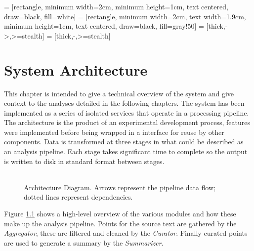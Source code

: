  = [rectangle, minimum width=2cm, minimum height=1cm, text centered, draw=black, fill=white]
 = [rectangle, minimum width=2cm, text width=1.9cm, minimum height=1cm, text centered, draw=black, fill=gray!50]
 = [thick,->,>=stealth]
 = [thick,-,>=stealth]

\chapter{System Architecture\label{chap:system-architecture}}
  This chapter is intended to give a technical overview of the system and give context to the analyses detailed in the following chapters. The system has been implemented as a series of isolated services that operate in a processing pipeline. The architecture is the product of an experimental development process, features were implemented before being wrapped in a interface for reuse by other components. Data is transformed at three stages in what could be described as an analysis pipeline. Each stage takes significant time to complete so the output is written to disk in standard format between stages.

  \begin{figure}[!h]
    \centering
    \caption{\\Architecture Diagram. Arrows represent the pipeline data flow; dotted lines represent dependencies.}
    \label{fig:arch-dia}
  \end{figure}

  Figure \ref{fig:arch-dia} shows a high-level overview of the various modules and how these make up the analysis pipeline. Points for the source text are gathered by the \textit{Aggregator}, these are filtered and cleaned by the \textit{Curator}. Finally curated points are used to generate a summary by the \textit{Summarizer}.

